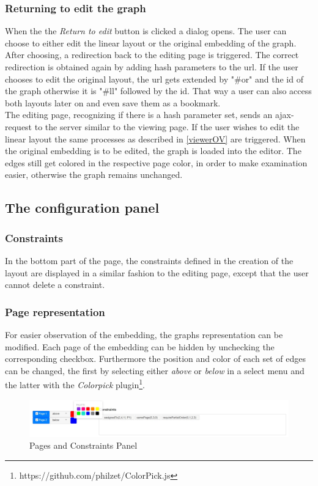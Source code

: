 \subsubsection{Returning to edit the graph}
\label{BtoEdit}
When the the \textit{Return to edit} button is clicked a dialog opens. The user can choose to either edit the linear layout or the original embedding of the graph. After choosing, a redirection back to the editing page is triggered.
The correct redirection is obtained again by adding hash parameters to the url. If the user chooses to edit the original layout, the url gets extended by "\#or" and the id of the graph otherwise it is "\#ll" followed by the id. That way a user can also access both layouts later on and even save them as a bookmark.\\
The editing page, recognizing if there is a hash parameter set, sends an ajax-request to the server similar to the viewing page. If the user wishes to edit the linear layout the same processes as described in \autoref{viewerOV} are triggered. When the original embedding is to be edited, the graph is loaded into the editor. The edges still get colored in the respective page color, in order to make examination easier, otherwise the graph remains unchanged.\\
\subsection{The configuration panel}
\subsubsection{Constraints}
In the bottom part of the page, the constraints defined in the creation of the layout are displayed in a similar fashion to the editing page, except that the user cannot delete a constraint.
\subsubsection{Page representation}
For easier observation of the embedding, the graphs representation can be modified. Each page of the embedding can be hidden by unchecking the corresponding checkbox. Furthermore the position and color of each set of edges can be changed, the first by selecting either \textit{above} or \textit{below} in a select menu and the latter with the \textit{Colorpick} plugin\footnote{https://github.com/philzet/ColorPick.js}.
\begin{figure}[!h]
\begin{center}
\includegraphics[width=1\textwidth]{figures/figSecond/ConfigPanel.jpg}
\caption{Pages and Constraints Panel}
\label{img:plzhltr}
\end{center}
\end{figure}

\clearpage
